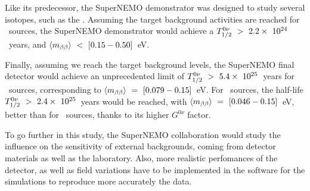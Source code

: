 Like its predecessor, the SuperNEMO demonstrator was designed to study several isotopes, such as the \Nd.
Assuming the target background activities are reached for \Nd\ sources, the SuperNEMO demonstrator would achieve a $T_{1/2}^{0\nu}~>~2.2\times~10^{24}$~years, and $\langle m_{\beta\beta}\rangle~<~[0.15-0.50]$~eV.

Finally, assuming we reach the target background levels, the SuperNEMO final detector would achieve an unprecedented limit of $T_{1/2}^{0\nu}~>~5.4\times~10^{25}$~years for \Se\ sources, corresponding to $\langle m_{\beta\beta}\rangle~=~[0.079-0.15]$~eV.
For \Nd\ sources, the half-life $T_{1/2}^{0\nu}~>~2.4\times~10^{25}$~years would be reached, with $\langle m_{\beta\beta}\rangle~=~[0.046-0.15]$~eV, better than for \Se\ sources, thanks to its higher $G^{0\nu}$ factor.

To go further in this study, the SuperNEMO collaboration would study the influence on the sensitivity of external backgrounds, coming from detector materials as well as the laboratory.
Also, more realistic perfomances of the detector, as well as field variations have to be implemented in the software for the simulations to reproduce more accurately the data.



